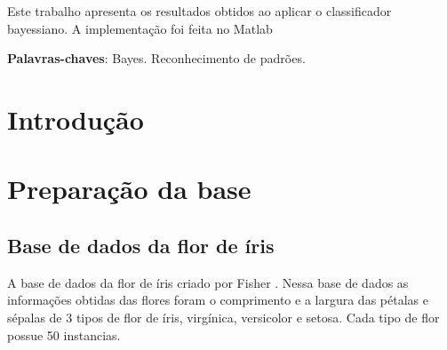 \documentclass[ 
	article,			%
	11pt,				%
	oneside,			%
	a4paper,			%
	english,			%
	brazil,				%
	]{abntex2}
\begin{document}
\frenchspacing 


%
%
\maketitle

\begin{resumoumacoluna}
 Este trabalho apresenta os resultados obtidos ao aplicar o classificador
 bayessiano. A implementação foi feita no
 Matlab\texttrademark 
 
 
 \vspace{\onelineskip}
 
 \noindent
 \textbf{Palavras-chaves}: Bayes. Reconhecimento de padrões.
\end{resumoumacoluna}


\textual

\section*{Introdução}


\section{Preparação da base}
\subsection{Base de dados da flor de íris}
A base de dados da flor de íris criado por Fisher \cite{AHG2137}. Nessa base de
dados as informações obtidas das flores foram o comprimento e a largura das
pétalas e sépalas de 3 tipos de flor de íris, virgínica, versicolor e setosa.
Cada tipo de flor possue 50 instancias.
\end{document}

